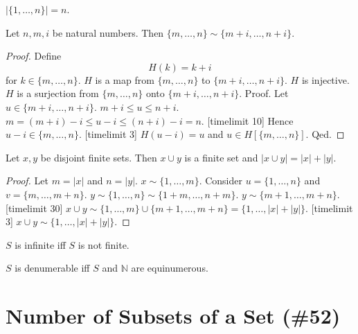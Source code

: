 \documentclass{article}
\newcommand{\Seq}[2]{\{#1,\dots,#2\}}
\begin{document}
\begin{forthel}
  \begin{lemma}
  $|\Seq{1}{n}| = n$.
  \end{lemma}

  \begin{lemma}
  Let $n,m,i$ be natural numbers.
  Then $\Seq{m}{n} \sim \Seq{m+i}{n+i}$.
  \end{lemma}
  \begin{proof}
  Define \[ H(k) = k + i \]
          for $k \in \Seq{m}{n}$.
  $H$ is a map from $\Seq{m}{n}$ to $\Seq{m+i}{n+i}$.
  $H$ is injective.
  $H$ is a surjection from $\Seq{m}{n}$ onto $\Seq{m+i}{n+i}$.
  Proof.
  Let $u \in \Seq{m+i}{n+i}$. $m + i \leq u \leq n + i$.
  $m  = (m + i) - i \leq u - i \leq (n + i) - i = n$.
[timelimit 10]
  Hence $u - i \in \Seq{m}{n}$.
[timelimit 3] $H(u-i) = u$ and
  $u \in H[\Seq{m}{n}]$.
  Qed.
  \end{proof}

  \begin{lemma}
  Let $x,y$ be disjoint finite sets.
  Then $x \cup y$ is a finite set and $|x \cup y| = |x| + |y|$.
  \end{lemma}
  \begin{proof}
  Let $m = |x|$ and $n = |y|$.
  $x \sim \Seq{1}{m}$.
  Consider $u = \Seq{1}{n}$ and $v = \Seq{m}{m+n}$.
  $y \sim \Seq{1}{n} \sim \Seq{1+m}{n+m}$.
  $y \sim \Seq{m+1}{m+n}$.[timelimit 30]
  $x \cup y \sim \Seq{1}{m} \cup \Seq{m+1}{m+n} = \Seq{1}{|x|+|y|}$. [timelimit 3]
  $x \cup y \sim \Seq{1}{|x|+|y|}$.
  \end{proof}


  \begin{definition}
  $S$ is infinite iff $S$ is not finite.
  \end{definition}

  \begin{definition}
  $S$ is denumerable iff $S$ and $\mathbb{N}$ are equinumerous.
  \end{definition}
  \end{forthel}


  \section{Number of Subsets of a Set (\#52)}
\end{document}
